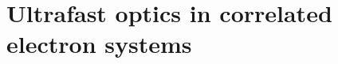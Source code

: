 \documentclass[
    letterpaper,
    12pt,
    openbib,
]{memoir}
\begin{document}
\frontmatter*


\acknowledgements

\clearpage
\preface

\clearpage

\tableofcontents
\clearpage
\listoffigures
\clearpage
\listoftables
\clearpage

\mainmatter*
\chapter{Ultrafast optics in correlated electron systems\label{ch:intro}}

% 
% 
% 
% 
% 

\backmatter*

\end{document}
